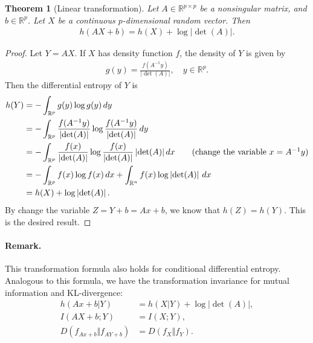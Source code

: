 \documentclass{article}
\numberwithin{equation}{section}
\newcommand{\bbR}{\mathbb{R}}
\theoremstyle{plain}
\newtheorem{theorem}{Theorem}[section]
\theoremstyle{definition}
\begin{document}
\begin{theorem}[Linear transformation]
Let $A\in\bbR^{p\times p}$ be a nonsingular matrix, and $b\in\bbR^p$. Let $X$ be a continuous $p$-dimensional random vector. Then
\begin{align*}
	h(AX+b)=h(X)+\log\left\vert\det(A)\right\vert.
\end{align*}
\end{theorem}
\begin{proof}
Let $Y=AX$. If $X$ has density function $f$, the density of $Y$ is given by
\begin{align*}
	g(y)=\frac{f(A^{-1}y)}{\left\vert\det(A)\right\vert},\quad y\in\bbR^p.
\end{align*}
Then the differential entropy of $Y$ is
\begin{align*}
	h(Y)&=-\int_{\bbR^p}g(y)\log g(y)\,dy\\
	&=-\int_{\bbR^p}\frac{f(A^{-1}y)}{\left\vert\det(A)\right\vert}\log\frac{f(A^{-1}y)}{\left\vert\det(A)\right\vert}\,dy\\
	&=-\int_{\bbR^p}\frac{f(x)}{\left\vert\det(A)\right\vert}\log\frac{f(x)}{\left\vert\det(A)\right\vert}\left\vert\det(A)\right\vert dx\tag{change the variable $x=A^{-1}y$}\\
	&=-\int_{\bbR^p}f(x)\log f(x)\,dx+\int_{\bbR^n}f(x)\log\left\vert\det(A)\right\vert\,dx\\
	&=h(X)+\log\left\vert\det(A)\right\vert.
\end{align*}
By change the variable $Z=Y+b=Ax+b$, we know that $h(Z)=h(Y)$. This is the desired result.
\end{proof}
\paragraph{Remark.} This transformation formula also holds for conditional differential entropy. Analogous to this formula, we have the transformation invariance for mutual information and KL-divergence:
\begin{align*}
	h(Ax+b|Y)&=h(X|Y)+\log\left\vert\det(A)\right\vert,\\
	I(AX+b;Y)&=I(X;Y),\\
    D(f_{Ax+b}\Vert f_{AY+b})&=D(f_X\Vert f_Y).
\end{align*}
\end{document}
